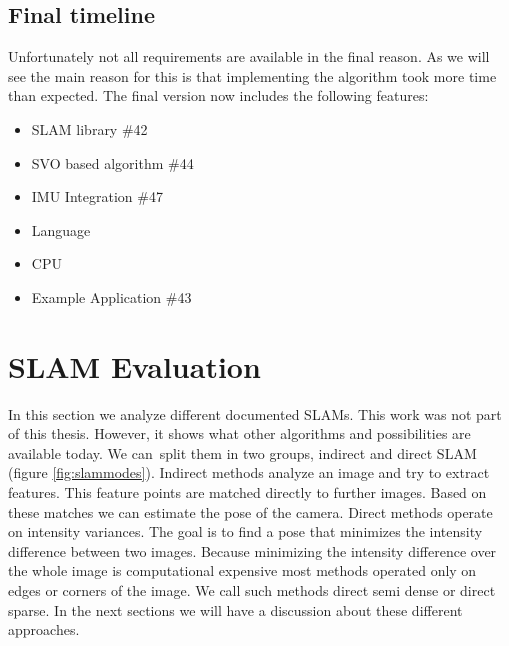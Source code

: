 \documentclass[11pt,a4paper,titlepage,oneside]{report}
\begin{document}
\section{Final timeline}

Unfortunately not all requirements are available in the final reason. As we will see the main reason for this is that implementing the algorithm took more time than expected. The final version now includes the following features:
\begin{itemize}
	\item{SLAM library \#42}
	\item{SVO based algorithm \#44}
	\item{IMU Integration \#47}
	\item{Language}
	\item{CPU}
	\item{Example Application \#43}
\end{itemize}

\chapter{SLAM Evaluation}\label{chap:evaluation}

In this section we analyze different documented SLAMs. This work was not part of this thesis. However, it shows what other algorithms and possibilities are available today. We can split them in two groups, indirect and direct SLAM (figure \ref{fig:slammodes}). Indirect methods analyze an image and try to extract features. This feature points are matched directly to further images. Based on these matches we can estimate the pose of the camera. Direct methods operate on intensity variances. The goal is to find a pose that minimizes the intensity difference between two images. Because minimizing the intensity difference over the whole image is computational expensive most methods operated only on edges or corners of the image. We call such methods direct semi dense or direct sparse. In the next sections we will have a discussion about these different approaches.
\end{document}

